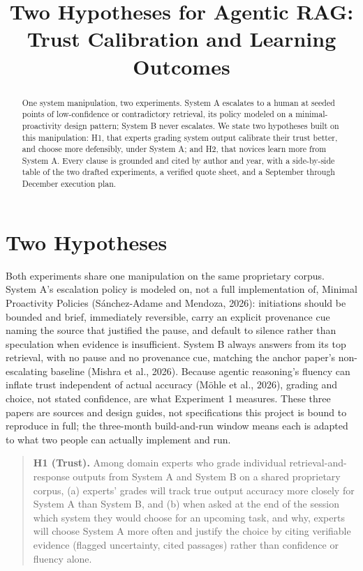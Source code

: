 \documentclass[9pt,conference]{IEEEtran}
\begin{document}
\title{Two Hypotheses for Agentic RAG: Trust Calibration and Learning Outcomes}

\author{
}

\maketitle

\begin{abstract}
One system manipulation, two experiments. System A escalates to a
human at seeded points of low-confidence or contradictory retrieval,
its policy modeled on a minimal-proactivity design pattern; System B
never escalates.
We state two hypotheses built on this manipulation: H1, that experts
grading system output calibrate their trust better, and choose more
defensibly, under System A; and H2, that novices learn more from
System A. Every clause is grounded and cited by author and year, with
a side-by-side table of the two drafted experiments, a verified
quote sheet, and a September through December execution plan.
\end{abstract}

\section{Two Hypotheses}
\label{sec:hyp}

Both experiments share one manipulation on the same proprietary
corpus. System A's escalation policy is modeled on, not a full
implementation of, Minimal Proactivity Policies (Sánchez-Adame and
Mendoza, 2026): initiations should be bounded and brief, immediately
reversible, carry an explicit provenance cue naming the source that
justified the pause, and default to silence rather than speculation
when evidence is insufficient. System B always answers from its top
retrieval, with no pause and no provenance cue, matching the anchor
paper's non-escalating baseline (Mishra et al., 2026). Because
agentic reasoning's fluency can inflate trust independent of actual
accuracy (Möhle et al., 2026), grading and choice, not stated
confidence, are what Experiment 1 measures. These three papers are
sources and design guides, not specifications this project is bound
to reproduce in full; the three-month build-and-run window means each
is adapted to what two people can actually implement and run.

\begin{quote}\small
\textbf{H1 (Trust).} Among domain experts who grade individual
retrieval-and-response outputs from System A and System B on a shared
proprietary corpus, (a) experts' grades will track true output
accuracy more closely for System A than System B, and (b) when asked
at the end of the session which system they would choose for an
upcoming task, and why, experts will choose System A more often and
justify the choice by citing verifiable evidence (flagged uncertainty,
cited passages) rather than confidence or fluency alone.
\end{quote}
\end{document}
